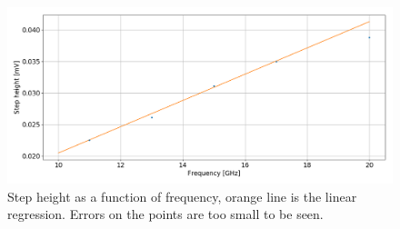 \documentclass[a4paper,10pt]{article}
\begin{document}
\begin{figure}[H]
\centering
\includegraphics[width = \textwidth]{eh}
\caption{Step height as a function of frequency, orange line is the linear regression. Errors on the points are too small to be seen.}\label{eh}
\end{figure}
\end{document}
